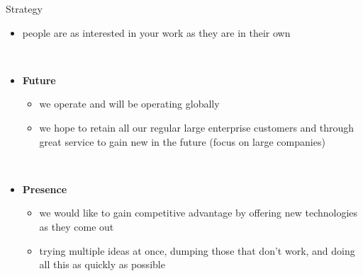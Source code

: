 \documentclass[]{beamer}
\begin{document}
    \begin{frame}{Strategy}
      \begin{adjustwidth}{-5mm}{0mm}
        \begin{itemize}
          \item people are as interested in your work as they are in their own

          \hfill\\

          \item \textbf{Future}
            \begin{itemize}
              \item we operate and will be operating globally
              \item we hope to retain all our regular large enterprise customers and through great service to gain new in the future (focus on large companies)
            \end{itemize}

          \hfill\\

          \item \textbf{Presence}
            \begin{itemize}
              \item we would like to gain competitive advantage by offering new technologies as they come out
              \item trying multiple ideas at once, dumping those that don't work, and doing all this as quickly as possible
            \end{itemize}
        \end{itemize}
      \end{adjustwidth}
    \end{frame}
\end{document}

